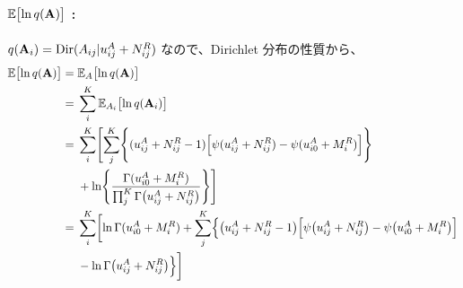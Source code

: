 \paragraph{ $\mathbb{E}\bigl[\ln q({\bf A}) \bigr]$ : }
$q({\bf A}_i) = {\rm Dir}(A_{ij}|u_{ij}^A + N_{ij}^R)$ なので、Dirichlet  分布の性質から、
\begin{align}
  \mathbb{E}\bigl[\ln q({\bf A}) \bigr]  =\;&  \mathbb{E}_{A}\bigl[ \ln q({\bf A}) \bigr]  \\
%
  =\;&  \sum_i^K \mathbb{E}_{A_i}\bigl[ \ln q({\bf A}_i) \bigr]  \\
%
  =\;&  \sum_i^K \Biggl[ \sum_j^K \Biggl\{ (u_{ij}^A + N_{ij}^R - 1) \Bigl[ \psi(u_{ij}^A + N_{ij}^R) - \psi(u_{i0}^A + M_i^R) \Bigr] \Biggr\}  \notag  \\
  &  + \ln \Biggl\{ \frac{ \Gamma(u_{i0}^A + M_i^R) }{ \prod_j^K \Gamma\bigl(u_{ij}^A + N_{ij}^R\bigr) } \Biggr\} \Biggr]  \\
%
  =\;&  \sum_i^K \biggl[ \ln \Gamma(u_{i0}^A + M_i^R)  %
    + \sum_j^K \Bigl\{ \bigl(u_{ij}^A + N_{ij}^R - 1\bigr) \Bigl[ \psi\bigl(u_{ij}^A + N_{ij}^R\bigr) - \psi\bigl(u_{i0}^A + M_i^R\bigr) \Bigr]  \notag  \\
  &  - \ln \Gamma\bigl(u_{ij}^A + N_{ij}^R\bigr) \Bigr\} \biggr]  %
\end{align}




